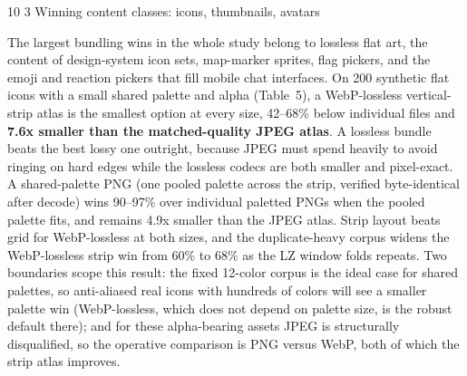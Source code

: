 \documentclass[3p,twocolumn]{elsarticle}
\makeatletter
\renewcommand\subsection{\@startsection{subsection}{2}{\z@}%
           {10\p@ \@plus 3\p@ \@minus 3\p@}%
           {3\p@ \@plus 2\p@ \@minus 1\p@}%
           {\normalfont\normalsize\itshape}}
\makeatother
\begin{document}
\subsection{Winning content classes: icons, thumbnails,
avatars}

The largest bundling wins in the whole study belong to lossless flat
art, the content of design-system icon sets, map-marker sprites, flag
pickers, and the emoji and reaction pickers that fill mobile chat
interfaces. On 200 synthetic flat icons with a small shared palette and
alpha (Table~5), a WebP-lossless vertical-strip atlas is the smallest
option at every size, 42--68\% below individual files and \textbf{7.6x
smaller than the matched-quality JPEG atlas}. A lossless bundle beats
the best lossy one outright, because JPEG must spend heavily to avoid
ringing on hard edges while the lossless codecs are both smaller and
pixel-exact. A shared-palette PNG (one pooled palette across the strip,
verified byte-identical after decode) wins 90--97\% over individual
paletted PNGs when the pooled palette fits, and remains 4.9x smaller
than the JPEG atlas. Strip layout beats grid for WebP-lossless at both
sizes, and the duplicate-heavy corpus widens the WebP-lossless strip win
from 60\% to 68\% as the LZ window folds repeats. Two boundaries scope
this result: the fixed 12-color corpus is the ideal case for shared
palettes, so anti-aliased real icons with hundreds of colors will see a
smaller palette win (WebP-lossless, which does not depend on palette
size, is the robust default there); and for these alpha-bearing assets
JPEG is structurally disqualified, so the operative comparison is PNG
versus WebP, both of which the strip atlas improves.
\end{document}
